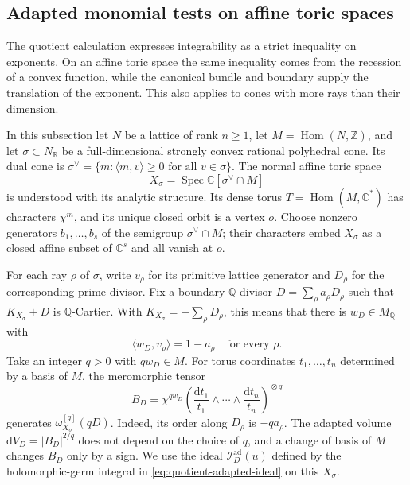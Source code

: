 \subsection{Adapted monomial tests on affine toric spaces}
\label{subsec:affine-toric-adapted-ideals}

The quotient calculation expresses integrability as a strict inequality on exponents. On an affine toric space the same inequality comes from the recession of a convex function, while the canonical bundle and boundary supply the translation of the exponent. This also applies to cones with more rays than their dimension.

In this subsection let $N$ be a lattice of rank $n\geq1$, let $M=\operatorname{Hom}(N,\mathbb Z)$, and let $\sigma\subset N_{\mathbb R}$ be a full-dimensional strongly convex rational polyhedral cone. Its dual cone is $\sigma^\vee=\{m:\langle m,v\rangle\geq0\text{ for all }v\in\sigma\}$. The normal affine toric space
\[
 X_\sigma=\operatorname{Spec}\mathbb C[\sigma^\vee\cap M]
\]
is understood with its analytic structure. Its dense torus $T=\operatorname{Hom}(M,\mathbb C^*)$ has characters $\chi^m$, and its unique closed orbit is a vertex $o$. Choose nonzero generators $b_1,\ldots,b_s$ of the semigroup $\sigma^\vee\cap M$; their characters embed $X_\sigma$ as a closed affine subset of $\mathbb C^s$ and all vanish at $o$.

For each ray $\rho$ of $\sigma$, write $v_\rho$ for its primitive lattice generator and $D_\rho$ for the corresponding prime divisor. Fix a boundary $\mathbb Q$-divisor $D=\sum_\rho a_\rho D_\rho$ such that $K_{X_\sigma}+D$ is $\mathbb Q$-Cartier. With $K_{X_\sigma}=-\sum_\rho D_\rho$, this means that there is $w_D\in M_{\mathbb Q}$ with
\begin{equation}\label{eq:toric-boundary-shift}
 \langle w_D,v_\rho\rangle=1-a_\rho\quad\text{for every }\rho.
\end{equation}
Take an integer $q>0$ with $qw_D\in M$. For torus coordinates $t_1,\ldots,t_n$ determined by a basis of $M$, the meromorphic tensor
\[
 B_D=\chi^{qw_D}
       \left(\frac{\mathrm dt_1}{t_1}\wedge\cdots\wedge
                         \frac{\mathrm dt_n}{t_n}\right)^{\!\otimes q}
\]
generates $\omega_{X_\sigma}^{[q]}(qD)$. Indeed, its order along $D_\rho$ is $-qa_\rho$. The adapted volume $\mathrm dV_D=|B_D|^{2/q}$ does not depend on the choice of $q$, and a change of basis of $M$ changes $B_D$ only by a sign. We use the ideal $\mathcal I_D^{\mathrm{ad}}(u)$ defined by the holomorphic-germ integral in \eqref{eq:quotient-adapted-ideal} on this $X_\sigma$.

